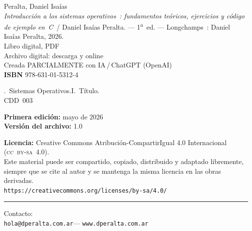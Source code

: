 \begin{minipage}{0.82\textwidth}

\begin{tcolorbox}[
  colback=white,
  colframe=black!55,
  arc=2pt,
  boxrule=0.5pt,
  left=14pt, right=14pt, top=11pt, bottom=11pt
]
{\small
\noindent Peralta, Daniel Isaías\\[0.4em]
\hspace*{1.6em}\textit{Introducción a los sistemas operativos~:
fundamentos teóricos, ejercicios y código de ejemplo en~C}~/
Daniel Isaías Peralta. ---
1\textsuperscript{a}~ed. ---
Longchamps~: Daniel Isaías Peralta, 2026.\\[0.4em]
\hspace*{1.6em}Libro digital, PDF\\[0.5em]
\hspace*{1.6em}Archivo digital: descarga y online\\
\hspace*{1.6em}Creada PARCIALMENTE con IA\,/\,ChatGPT (OpenAI)\\[0.5em]
\hspace*{1.6em}\textbf{ISBN} 978-631-01-5312-4
}

\vspace{0.75em}

{\small
{}.~Sistemas Operativos.\quad I.~Título.\\
CDD~003
}
\end{tcolorbox}

\vspace{1.1em}

{\small
\noindent\textbf{Primera edición:} mayo de 2026\\[0.25em]
\noindent\textbf{Versión del archivo:} 1.0
}

{\small
\noindent\textbf{Licencia:}
Creative Commons Atribución-CompartirIgual 4.0 Internacional
(\textsc{cc~by-sa}~4.0).\\[0.25em]
Este material puede ser compartido, copiado, distribuido y adaptado
libremente, siempre que se cite al autor y se mantenga la misma
licencia en las obras derivadas.\\[0.3em]
\texttt{https://creativecommons.org/licenses/by-sa/4.0/}
}

\vspace{0.9em}
\noindent\rule{\linewidth}{0.25pt}
\vspace{0.7em}

{\small
Contacto:\\
\texttt{hola@dperalta.com.ar}\enspace---\enspace
\texttt{www.dperalta.com.ar}
}

\end{minipage}

